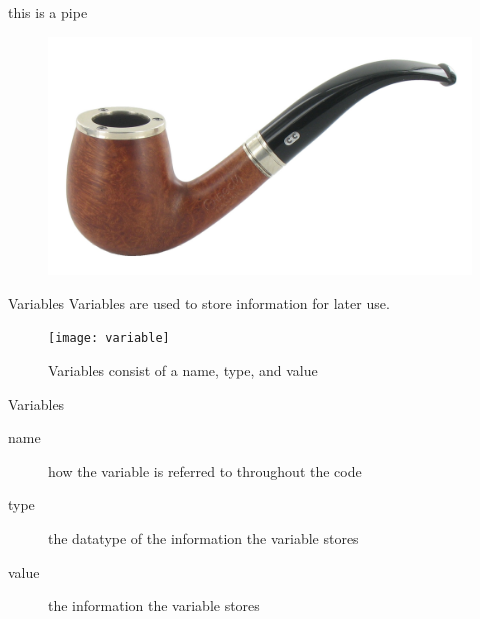 \documentclass[xcolor={dvipsnames}]{beamer}
\begin{document}
\begin{frame}{this is a pipe}
	\begin{figure}
		\includegraphics[width=1\textwidth]{pipe}
	\end{figure}
\end{frame}

\begin{frame}{Variables}
	Variables are used to store information for later use. 
	\begin{figure}
		\texttt{[image: variable]}
		\caption{Variables consist of a name, type, and value}
	\end{figure}
\end{frame}

\begin{frame}{Variables}
	\begin{description}
		\item[name] how the variable is referred to throughout the code
		\pause
		\item[type] the datatype of the information the variable stores
		\pause
		\item[value] the information the variable stores
	\end{description}
\end{frame}
\end{document}
